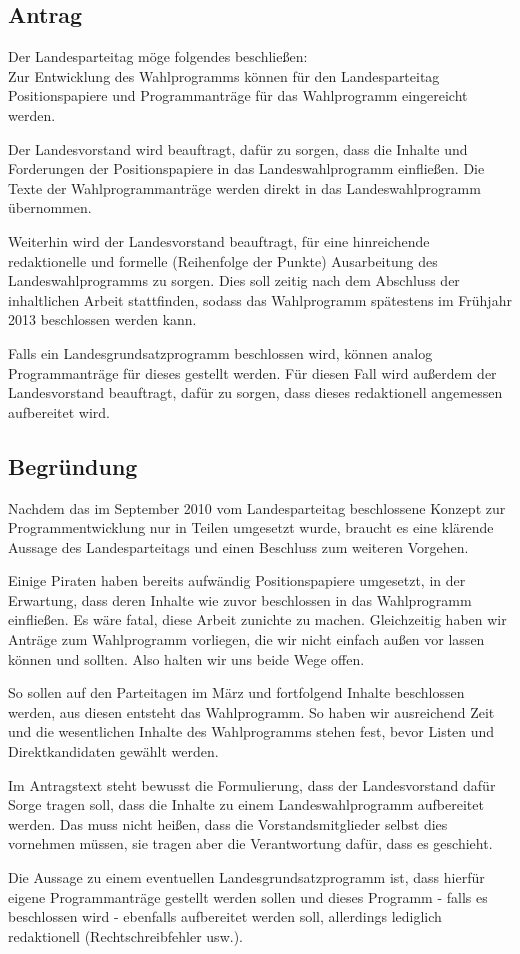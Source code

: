 \subsection{Antrag}
Der Landesparteitag möge folgendes beschließen:\\
Zur Entwicklung des Wahlprogramms können für den Landesparteitag Positionspapiere und
Programmanträge für das Wahlprogramm eingereicht werden.\par
Der Landesvorstand wird beauftragt, dafür zu sorgen, dass die Inhalte und Forderungen der
Positionspapiere in das Landeswahlprogramm einfließen. Die Texte der Wahlprogrammanträge
werden direkt in das Landeswahlprogramm übernommen.\par
Weiterhin wird der Landesvorstand beauftragt, für eine hinreichende redaktionelle und formelle
(Reihenfolge der Punkte) Ausarbeitung des Landeswahlprogramms zu sorgen. Dies soll zeitig nach
dem Abschluss der inhaltlichen Arbeit stattfinden, sodass das Wahlprogramm spätestens im
Frühjahr 2013 beschlossen werden kann.\par
Falls ein Landesgrundsatzprogramm beschlossen wird, können analog Programmanträge für dieses
gestellt werden. Für diesen Fall wird außerdem der Landesvorstand beauftragt, dafür zu sorgen,
dass dieses redaktionell angemessen aufbereitet wird.
\subsection{Begründung}
Nachdem das im September 2010 vom Landesparteitag beschlossene Konzept zur
Programmentwicklung nur in Teilen umgesetzt wurde, braucht es eine klärende Aussage des
Landesparteitags und einen Beschluss zum weiteren Vorgehen.\par
Einige Piraten haben bereits aufwändig Positionspapiere umgesetzt, in der Erwartung, dass deren
Inhalte wie zuvor beschlossen in das Wahlprogramm einfließen. Es wäre fatal, diese Arbeit zunichte
zu machen. Gleichzeitig haben wir Anträge zum Wahlprogramm vorliegen, die wir nicht einfach
außen vor lassen können und sollten. Also halten wir uns beide Wege offen.\par
So sollen auf den Parteitagen im März und fortfolgend Inhalte beschlossen werden, aus diesen
entsteht das Wahlprogramm. So haben wir ausreichend Zeit und die wesentlichen Inhalte des
Wahlprogramms stehen fest, bevor Listen und Direktkandidaten gewählt werden.\par
Im Antragstext steht bewusst die Formulierung, dass der Landesvorstand dafür Sorge tragen soll,
dass die Inhalte zu einem Landeswahlprogramm aufbereitet werden. Das muss nicht heißen, dass
die Vorstandsmitglieder selbst dies vornehmen müssen, sie tragen aber die Verantwortung dafür,
dass es geschieht.\par
Die Aussage zu einem eventuellen Landesgrundsatzprogramm ist, dass hierfür eigene
Programmanträge gestellt werden sollen und dieses Programm - falls es beschlossen wird -
ebenfalls aufbereitet werden soll, allerdings lediglich redaktionell (Rechtschreibfehler usw.).
